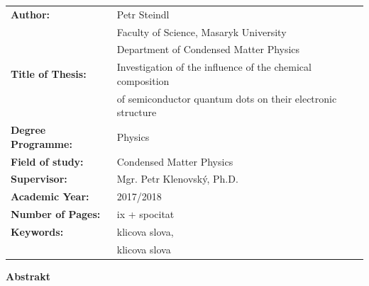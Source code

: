 \documentclass[
a4paper, %
11pt, %
onecolumn, %
openany, %
oldfontcommands,
]{memoir}
\begin{document}
\normalsize
\begin{tabular}{ll}
	\textbf{Author:} & Petr Steindl \\[-0.5cm]
	& Faculty of Science, Masaryk University \\[-0.5cm]
	& Department of Condensed Matter Physics \\[-0.5cm]
	\textbf{Title of Thesis:} &  Investigation of the influence of the chemical composition \\[-0.5cm]
	& of semiconductor quantum dots on their electronic structure\\
	\textbf{Degree Programme:}& Physics \\
	\textbf{Field of study:}& Condensed Matter Physics \\
	\textbf{Supervisor:}& Mgr. Petr Klenovský, Ph.D. \\
	\textbf{Academic Year:}& 2017/2018 \\
	\textbf{Number of Pages:}& ix + spocitat \\
	\textbf{Keywords:}& klicova slova,\\[-0.5cm]
	& klicova slova \\
\end{tabular}
\renewcommand{\arraystretch}{1} 
\newpage

\noindent\Large\textbf{Abstrakt}\\ \normalsize

\end{document}
